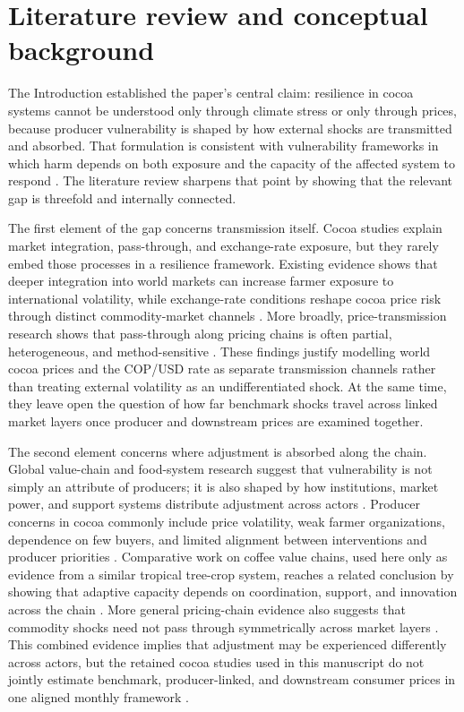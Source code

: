 \documentclass[11pt]{article}
\begin{document}
\section{Literature review and conceptual background}
\label{sec:litreview}

The Introduction established the paper's central claim: resilience in cocoa systems cannot be understood only through climate stress or only through prices, because producer vulnerability is shaped by how external shocks are transmitted and absorbed. That formulation is consistent with vulnerability frameworks in which harm depends on both exposure and the capacity of the affected system to respond \citep{Turner2003,Adger2006}. The literature review sharpens that point by showing that the relevant gap is threefold and internally connected.

The first element of the gap concerns transmission itself. Cocoa studies explain market integration, pass-through, and exchange-rate exposure, but they rarely embed those processes in a resilience framework. Existing evidence shows that deeper integration into world markets can increase farmer exposure to international volatility, while exchange-rate conditions reshape cocoa price risk through distinct commodity-market channels \citep{TsowouGayi2019,Jumah2001}. More broadly, price-transmission research shows that pass-through along pricing chains is often partial, heterogeneous, and method-sensitive \citep{MeyerCramon2004,acosta_ihle_voncramon_2019}. These findings justify modelling world cocoa prices and the COP/USD rate as separate transmission channels rather than treating external volatility as an undifferentiated shock. At the same time, they leave open the question of how far benchmark shocks travel across linked market layers once producer and downstream prices are examined together.

The second element concerns where adjustment is absorbed along the chain. Global value-chain and food-system research suggest that vulnerability is not simply an attribute of producers; it is also shaped by how institutions, market power, and support systems distribute adjustment across actors \citep{Gereffi2005,Merkle2021}. Producer concerns in cocoa commonly include price volatility, weak farmer organizations, dependence on few buyers, and limited alignment between interventions and producer priorities \citep{Mithofer2017}. Comparative work on coffee value chains, used here only as evidence from a similar tropical tree-crop system, reaches a related conclusion by showing that adaptive capacity depends on coordination, support, and innovation across the chain \citep{Morales2022,Verburg2019}. More general pricing-chain evidence also suggests that commodity shocks need not pass through symmetrically across market layers \citep{MeyerCramon2004,JimenezRodriguez2022}. This combined evidence implies that adjustment may be experienced differently across actors, but the retained cocoa studies used in this manuscript do not jointly estimate benchmark, producer-linked, and downstream consumer prices in one aligned monthly framework \citep{TsowouGayi2019,Jumah2001}. %
\end{document}
